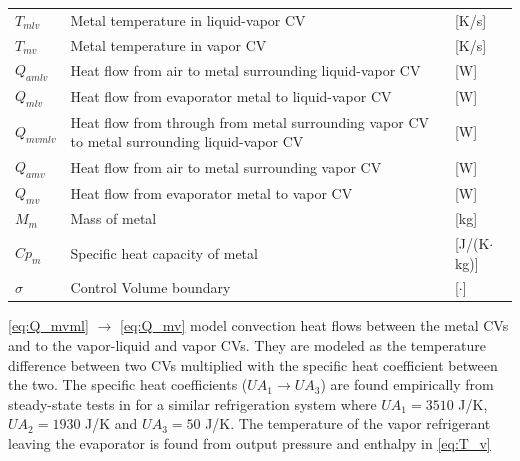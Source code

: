 \begin{center}
	\begin{tabular}{l p{10cm} l}
		$T_{mlv} $  & Metal temperature in liquid-vapor CV                                                        & [\si{K}/\si{s}]                   \\ %
		$T_{mv} $   & Metal temperature in vapor CV                                                               & [\si{K}/\si{s}]                   \\ %
		$Q_{amlv}$  & Heat flow from air to metal surrounding liquid-vapor CV                                     & [\si{W}]                          \\
		$Q_{mlv}$   & Heat flow from evaporator metal to liquid-vapor CV                                          & [\si{W}]                          \\
		$Q_{mvmlv}$ & Heat flow from through from metal surrounding vapor CV to metal surrounding liquid-vapor CV & [\si{W}]                          \\
		$Q_{amv}$   & Heat flow from air to metal surrounding vapor CV                                            & [\si{W}]                          \\
		$Q_{mv}$    & Heat flow from evaporator metal to vapor CV                                                 & [\si{W}]                          \\
		$M_{m} $    & Mass of metal                                                                               & [\si{kg}]                         \\
		$Cp_{m}$    & Specific heat capacity of metal                                                             & [\si{J}/(\si{K}$ \cdot $\si{kg})] \\
		$\sigma$    & Control Volume boundary                                                                     & [$\cdot$]
	\end{tabular}
\end{center}

\medskip
\cref{eq:Q_mvml} $\rightarrow$ \cref{eq:Q_mv} model convection heat flows between the metal CVs and to the vapor-liquid and vapor CVs. They are modeled as the temperature difference between two CVs multiplied with the specific heat coefficient between the two. The specific heat coefficients ($U A_1 \rightarrow U A_3$) are found empirically from steady-state tests in \cite{Sorensen2013} for a similar refrigeration system where $U A_1 = 3510$ \si{J}/\si{K}, $U A_2 = 1930$ \si{J}/\si{K} and $U A_3 = 50$ \si{J}/\si{K}. The temperature of the vapor refrigerant leaving the evaporator is found from output pressure and enthalpy in \cref{eq:T_v}

